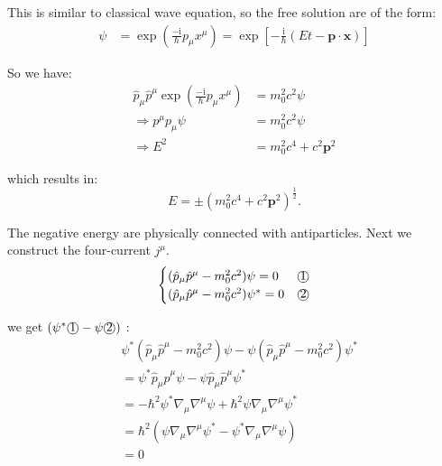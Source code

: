 This is similar to classical wave equation, so the free solution are of the form:
\begin{equation}
\begin{aligned}
\psi &= \exp\left( \frac{-\mathrm{i}}{\hbar} p_\mu x^\mu \right) = \exp\left[ -\frac{\mathrm{i}}{\hbar} (E t - \bm{p} \cdot \bm{x}) \right]
\end{aligned}
\end{equation}

So we have:
\begin{equation}
\begin{aligned}
\hat{p}_\mu \hat{p}^\mu \exp\left( \frac{-\mathrm{i}}{\hbar} p_\mu x^\mu \right) &= m_0^2 c^2 \psi \\
\Rightarrow p^\mu p_\mu \psi &= m_0^2 c^2 \psi \\
\Rightarrow E^2 &= m_0^2 c^4 + c^2 \bm{p}^2
\end{aligned}
\end{equation}

which results in:
\begin{equation}
E = \pm (m_0^2 c^4 + c^2 \bm{p}^2)^{\frac{1}{2}}.
\end{equation}

The negative energy are physically connected with antiparticles.
Next we construct the four-current $j^\mu$.
\begin{equation}
\begin{cases}
(\hat{p}_\mu \hat{p}^\mu - m_0^2 c^2) \psi = 0 & \text{\textcircled{1}} \\
(\hat{p}_\mu \hat{p}^\mu - m_0^2 c^2) \psi^* = 0 & \text{\textcircled{2}}
\end{cases}
\end{equation}

we get $(\psi^* \text{\textcircled{1}} - \psi \text{\textcircled{2}})$ :
\begin{equation}
\begin{aligned}
&\psi^* (\hat{p}_\mu \hat{p}^\mu - m_0^2 c^2) \psi - \psi (\hat{p}_\mu \hat{p}^\mu - m_0^2 c^2) \psi^* \\
&= \psi^* \hat{p}_\mu \hat{p}^\mu \psi - \psi \hat{p}_\mu \hat{p}^\mu \psi^* \\
&= -\hbar^2 \psi^* \nabla_\mu \nabla^\mu \psi + \hbar^2 \psi \nabla_\mu \nabla^\mu \psi^* \\
&= \hbar^2 (\psi \nabla_\mu \nabla^\mu \psi^* - \psi^* \nabla_\mu \nabla^\mu \psi) \\
&= 0
\end{aligned}
\end{equation}

